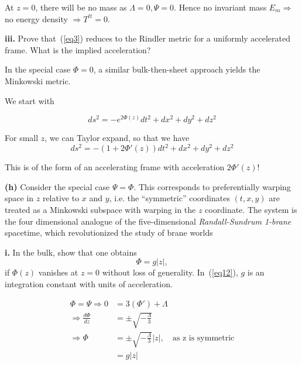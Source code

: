 \documentclass[a4paper]{article} %
\begin{document}
At $z=0$, there will be no mass as $\Lambda=0,\Psi=0$. Hence no invariant mass $E_{m} \Rightarrow$ no energy density $\Rightarrow T^{tt}=0$.


\begin{framed}
\textbf{iii.} Prove that~(\ref{eq3}) reduces to the Rindler metric for a uniformly accelerated frame.
What is the implied acceleration?

In the special case $\Phi = 0$, a similar bulk-then-sheet approach yields the Minkowski
metric.
\end{framed}

We start with

\begin{equation}
ds^2=-e^{2\Phi(z)}dt^2 + dx^2 + dy^2 + dz^2
\end{equation}

For small $z$, we can Taylor expand, so that we have
\begin{equation}
ds^2 = -\left(1+2\Phi'(z)\right)dt^2 + dx^2 + dy^2 + dz^2
\end{equation}

This is of the form of an accelerating frame with acceleration $2\Phi'(z)$!

\begin{framed}
\textbf{(h)} Consider the special case $\Psi=\Phi$. This corresponds to preferentially warping space in $z$ relative to $x$ and $y$, i.e. the ``symmetric'' coordinates $(t, x, y)$ are treated as a Minkowski subspace with warping in the $z$ coordinate. The system is the four dimensional analogue of the five-dimensional \emph{Randall-Sundrum 1-brane} spacetime, which revolutionized the study of brane worlds 
\end{framed}


\begin{framed}
\textbf{i.} In the bulk, show that one obtains
\begin{equation}
\Phi=g |z|,\label{eq12}
\end{equation}
if $\Phi(z)$ vanishes at $z = 0$ without loss of generality. In~(\ref{eq12}), $g$ is an integration
constant with units of acceleration.
\end{framed}


\begin{align}
\Phi = \Psi \Rightarrow 0 &= 3(\Phi') + \Lambda\\
\Rightarrow\frac{d\Phi}{dz}&= \pm \sqrt{-\frac{\Lambda}{3}}\\
\Rightarrow \Phi &= \pm \sqrt{-\frac{\Lambda}{3}}|z|,\quad\text{as z is symmetric}\\
&=g|z|
\end{align}
\end{document}
